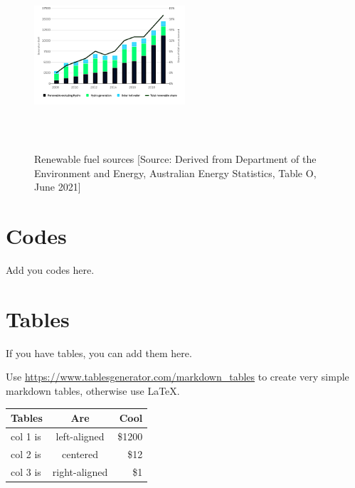 \documentclass[mstat,12pt]{unswthesis}
\begin{document}
\begin{figure}[H]
\centering
\includegraphics[width=0.5\textwidth,height=7cm]{renewable_fuel_sources_chart.png}
\caption{Renewable fuel sources [Source:
Derived from Department of the Environment and Energy, Australian Energy Statistics, Table O, June 2021]}\label{renewable}
\end{figure}

\section*{\texorpdfstring{\textbf{Codes}}{Codes}}\label{codes}

Add you codes here.

\section*{\texorpdfstring{\textbf{Tables}}{Tables}}\label{tables}

If you have tables, you can add them here.

Use \url{https://www.tablesgenerator.com/markdown_tables} to create very
simple markdown tables, otherwise use \LaTeX.

\begin{longtable}[]{@{}lcr@{}}
\toprule\noalign{}
Tables & Are & Cool \\
\midrule\noalign{}
\endhead
\bottomrule\noalign{}
\endlastfoot
col 1 is & left-aligned & \$1200 \\
col 2 is & centered & \$12 \\
col 3 is & right-aligned & \$1 \\
\end{longtable}
\end{document}
